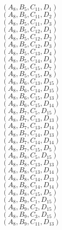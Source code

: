 \documentclass[14pt]{article}
\begin{document}
    $({A}_{8}, {B}_{5}, {C}_{11}, {D}_{1}) $ \\ 
    $({A}_{8}, {B}_{5}, {C}_{11}, {D}_{2}) $ \\ 
    $({A}_{8}, {B}_{5}, {C}_{11}, {D}_{3}) $ \\ 
    $({A}_{8}, {B}_{5}, {C}_{12}, {D}_{1}) $ \\ 
    $({A}_{8}, {B}_{5}, {C}_{12}, {D}_{2}) $ \\ 
    $({A}_{8}, {B}_{5}, {C}_{12}, {D}_{3}) $ \\ 
    $({A}_{8}, {B}_{5}, {C}_{13}, {D}_{4}) $ \\ 
    $({A}_{8}, {B}_{5}, {C}_{14}, {D}_{4}) $ \\ 
    $({A}_{8}, {B}_{5}, {C}_{15}, {D}_{7}) $ \\ 
    $({A}_{8}, {B}_{5}, {C}_{15}, {D}_{8}) $ \\ 
    $({A}_{8}, {B}_{6}, {C}_{13}, {D}_{15}) $ \\ 
    $({A}_{8}, {B}_{6}, {C}_{14}, {D}_{15}) $ \\ 
    $({A}_{8}, {B}_{6}, {C}_{15}, {D}_{13}) $ \\ 
    $({A}_{8}, {B}_{6}, {C}_{15}, {D}_{14}) $ \\ 
    $({A}_{8}, {B}_{7}, {C}_{5}, {D}_{15}) $ \\ 
    $({A}_{8}, {B}_{7}, {C}_{13}, {D}_{13}) $ \\ 
    $({A}_{8}, {B}_{7}, {C}_{13}, {D}_{14}) $ \\ 
    $({A}_{8}, {B}_{7}, {C}_{14}, {D}_{13}) $ \\ 
    $({A}_{8}, {B}_{7}, {C}_{14}, {D}_{14}) $ \\ 
    $({A}_{8}, {B}_{7}, {C}_{15}, {D}_{5}) $ \\ 
    $({A}_{8}, {B}_{8}, {C}_{5}, {D}_{15}) $ \\ 
    $({A}_{8}, {B}_{8}, {C}_{13}, {D}_{13}) $ \\ 
    $({A}_{8}, {B}_{8}, {C}_{13}, {D}_{14}) $ \\ 
    $({A}_{8}, {B}_{8}, {C}_{14}, {D}_{13}) $ \\ 
    $({A}_{8}, {B}_{8}, {C}_{14}, {D}_{14}) $ \\ 
    $({A}_{8}, {B}_{8}, {C}_{15}, {D}_{5}) $ \\ 
    $({A}_{8}, {B}_{9}, {C}_{1}, {D}_{15}) $ \\ 
    $({A}_{8}, {B}_{9}, {C}_{2}, {D}_{15}) $ \\ 
    $({A}_{8}, {B}_{9}, {C}_{3}, {D}_{15}) $ \\ 
    $({A}_{8}, {B}_{9}, {C}_{11}, {D}_{13}) $ \\ 
\end{document}
